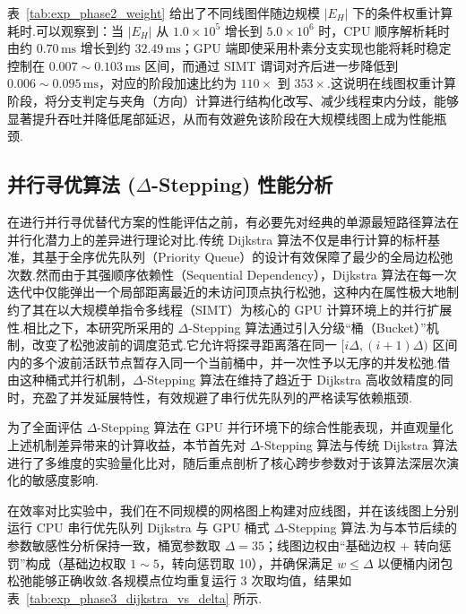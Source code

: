 

表~\ref{tab:exp_phase2_weight} 给出了不同线图伴随边规模 $|E_H|$ 下的条件权重计算耗时.可以观察到：当 $|E_H|$ 从 $1.0\times 10^5$ 增长到 $5.0\times 10^6$ 时，CPU 顺序解析耗时由约 $0.70\,\text{ms}$ 增长到约 $32.49\,\text{ms}$；GPU 端即使采用朴素分支实现也能将耗时稳定控制在 $0.007\sim0.103\,\text{ms}$ 区间，而通过 SIMT 谓词对齐后进一步降低到 $0.006\sim0.095\,\text{ms}$，对应的阶段加速比约为 $110\times$ 到 $353\times$.这说明在线图权重计算阶段，将分支判定与夹角（方向）计算进行结构化改写、减少线程束内分歧，能够显著提升吞吐并降低尾部延迟，从而有效避免该阶段在大规模线图上成为性能瓶颈.

\subsection{并行寻优算法 (\texorpdfstring{$\Delta$}{Delta}-Stepping) 性能分析}

在进行并行寻优替代方案的性能评估之前，有必要先对经典的单源最短路径算法在并行化潜力上的差异进行理论对比.传统 Dijkstra 算法不仅是串行计算的标杆基准，其基于全序优先队列（Priority Queue）的设计有效保障了最少的全局边松弛次数.然而由于其强顺序依赖性（Sequential Dependency），Dijkstra 算法在每一次迭代中仅能弹出一个局部距离最近的未访问顶点执行松弛，这种内在属性极大地制约了其在以大规模单指令多线程（SIMT）为核心的 GPU 计算环境上的并行扩展性.相比之下，本研究所采用的 $\Delta$-Stepping 算法通过引入分级“桶（Bucket）”机制，改变了松弛波前的调度范式.它允许将探寻距离落在同一 $[i\Delta, (i+1)\Delta)$ 区间内的多个波前活跃节点暂存入同一个当前桶中，并一次性予以无序的并发松弛.借由这种桶式并行机制，$\Delta$-Stepping 算法在维持了趋近于 Dijkstra 高收敛精度的同时，充盈了并发延展特性，有效规避了串行优先队列的严格读写依赖瓶颈.

为了全面评估 $\Delta$-Stepping 算法在 GPU 并行环境下的综合性能表现，并直观量化上述机制差异带来的计算收益，本节首先对 $\Delta$-Stepping 算法与传统 Dijkstra 算法进行了多维度的实验量化比对，随后重点剖析了核心跨步参数对于该算法深层次演化的敏感度影响.

在效率对比实验中，我们在不同规模的网格图上构建对应线图，并在该线图上分别运行 CPU 串行优先队列 Dijkstra 与 GPU 桶式 $\Delta$-Stepping 算法.为与本节后续的参数敏感性分析保持一致，桶宽参数取 $\Delta=35$；线图边权由“基础边权 + 转向惩罚”构成（基础边权取 $1\sim 5$，转向惩罚取 10），并确保满足 $w\le\Delta$ 以便桶内闭包松弛能够正确收敛.各规模点位均重复运行 3 次取均值，结果如表~\ref{tab:exp_phase3_dijkstra_vs_delta} 所示.



